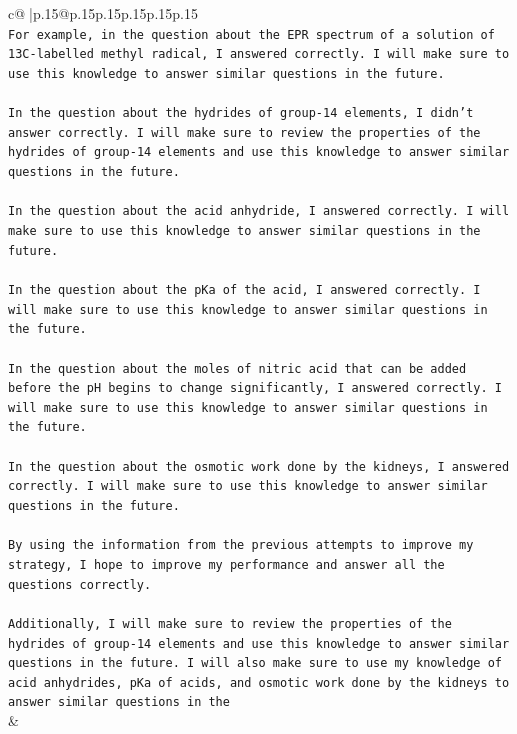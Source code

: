 \documentclass{article}
\begin{document}
{\begin{supertabular}{c@{$\;$}|p{.15\linewidth}@{}p{.15\linewidth}p{.15\linewidth}p{.15\linewidth}p{.15\linewidth}p{.15\linewidth}}
{{{\\ 
\texttt{For example, in the question about the EPR spectrum of a solution of 13C{-}labelled methyl radical, I answered correctly. I will make sure to use this knowledge to answer similar questions in the future.} \\
\\ 
\texttt{In the question about the hydrides of group{-}14 elements, I didn't answer correctly. I will make sure to review the properties of the hydrides of group{-}14 elements and use this knowledge to answer similar questions in the future.} \\
\\ 
\texttt{In the question about the acid anhydride, I answered correctly. I will make sure to use this knowledge to answer similar questions in the future.} \\
\\ 
\texttt{In the question about the pKa of the acid, I answered correctly. I will make sure to use this knowledge to answer similar questions in the future.} \\
\\ 
\texttt{In the question about the moles of nitric acid that can be added before the pH begins to change significantly, I answered correctly. I will make sure to use this knowledge to answer similar questions in the future.} \\
\\ 
\texttt{In the question about the osmotic work done by the kidneys, I answered correctly. I will make sure to use this knowledge to answer similar questions in the future.} \\
\\ 
\texttt{By using the information from the previous attempts to improve my strategy, I hope to improve my performance and answer all the questions correctly.} \\
\\ 
\texttt{Additionally, I will make sure to review the properties of the hydrides of group{-}14 elements and use this knowledge to answer similar questions in the future. I will also make sure to use my knowledge of acid anhydrides, pKa of acids, and osmotic work done by the kidneys to answer similar questions in the} \\
            }
        }
    }
    & \\ \\

\end{supertabular}
}
\end{document}
